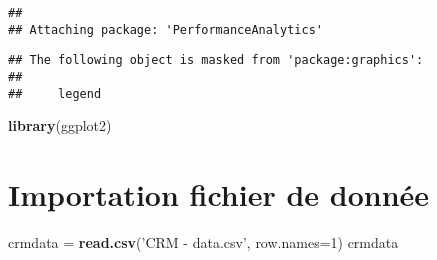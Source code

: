 \documentclass[]{article}
\newenvironment{Shaded}{\begin{snugshade}}{\end{snugshade}}
\newcommand{\DataTypeTok}[1]{\textcolor[rgb]{0.13,0.29,0.53}{#1}}
\newcommand{\DecValTok}[1]{\textcolor[rgb]{0.00,0.00,0.81}{#1}}
\newcommand{\KeywordTok}[1]{\textcolor[rgb]{0.13,0.29,0.53}{\textbf{#1}}}
\newcommand{\NormalTok}[1]{#1}
\newcommand{\StringTok}[1]{\textcolor[rgb]{0.31,0.60,0.02}{#1}}
\begin{document}
\begin{verbatim}
## 
## Attaching package: 'PerformanceAnalytics'
\end{verbatim}

\begin{verbatim}
## The following object is masked from 'package:graphics':
## 
##     legend
\end{verbatim}

\begin{Shaded}
\begin{Highlighting}[]
\KeywordTok{library}\NormalTok{(ggplot2)}
\end{Highlighting}
\end{Shaded}

\hypertarget{importation-fichier-de-donnuxe9e}{%
\section{Importation fichier de
donnée}\label{importation-fichier-de-donnuxe9e}}

\begin{Shaded}
\begin{Highlighting}[]
\NormalTok{crmdata =}\StringTok{ }\KeywordTok{read.csv}\NormalTok{(}\StringTok{'CRM - data.csv'}\NormalTok{, }\DataTypeTok{row.names=}\DecValTok{1}\NormalTok{)}
\NormalTok{crmdata}
\end{Highlighting}
\end{Shaded}
\end{document}
